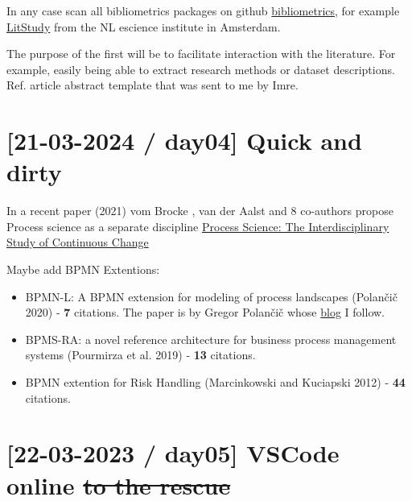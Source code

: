 \documentclass[
  letterpaper,
  DIV=11,
  numbers=noendperiod]{scrreprt}
\begin{document}
In any case scan all bibliometrics packages on github
\href{https://github.com/topics/bibliometrics}{bibliometrics}, for
example \href{https://github.com/NLeSC/litstudy}{LitStudy} from the NL
escience institute in Amsterdam.

The purpose of the first will be to facilitate interaction with the
literature. For example, easily being able to extract research methods
or dataset descriptions. Ref. article abstract template that was sent to
me by Imre.

\hypertarget{day04-quick-and-dirty}{%
\section{{[}21-03-2024 / day04{]} Quick and
dirty}\label{day04-quick-and-dirty}}

In a recent paper (2021) vom
Brocke
, van der
Aalst
and 8 co-authors propose Process science as a separate discipline
\href{https://papers.ssrn.com/sol3/papers.cfm?abstract_id=3916817}{Process
Science: The Interdisciplinary Study of Continuous Change}

Maybe add BPMN Extentions:

\begin{itemize}
\item
  BPMN-L: A BPMN extension for modeling of process
  landscapes (Polančič 2020) - \textbf{7} citations.
  The paper is by Gregor
  Polančič
  whose \href{https://polancic.com/}{blog} I follow.
\item
  BPMS-RA: a novel reference architecture for business process
  management systems (Pourmirza et al. 2019) - \textbf{13} citations.
\item
  BPMN extention for Risk Handling (Marcinkowski and Kuciapski 2012) -
  \textbf{44} citations.
\end{itemize}

\hypertarget{day05-vscode-online-to-the-rescue}{%
\section{\texorpdfstring{{[}22-03-2023 / day05{]} VSCode online \st{to
the
rescue}}{{[}22-03-2023 / day05{]} VSCode online to the rescue}}\label{day05-vscode-online-to-the-rescue}}
\end{document}
